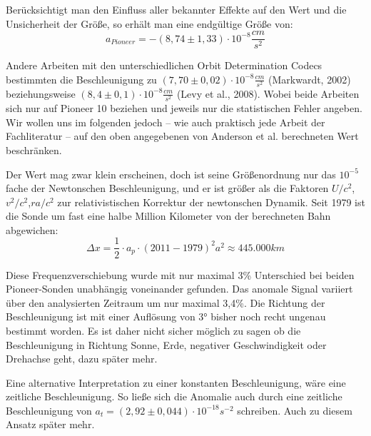 Berücksichtigt man den Einfluss aller bekannter Effekte auf den Wert und die Unsicherheit der Größe\cite{Turyshev2004}, so erhält man eine endgültige Größe von:  
\begin{equation}
  a_{Pioneer} = -(8,74\pm1,33)\cdot10^{-8}\frac{cm}{s^2}
\end{equation}

Andere Arbeiten mit den  unterschiedlichen Orbit Determination Codecs bestimmten die Beschleunigung zu $(7,70
\pm0,02)\cdot10^{-8}\frac{cm}{s^2}$ (Markwardt, 2002)\cite{Markwardt2002} beziehungsweise %
$(8,4\pm0,1)\cdot10^{-8}\frac{cm}{s^2}$ (Levy et al., 2008)\cite{Levy2008}.
Wobei beide Arbeiten sich nur auf Pioneer 10 beziehen und jeweils nur die statistischen Fehler angeben.
Wir wollen uns im folgenden jedoch – wie auch praktisch jede Arbeit der Fachliteratur – auf den oben angegebenen von
Anderson et al. berechneten Wert beschränken.

Der Wert mag zwar klein erscheinen, doch ist seine Größenordnung nur das $10^{-5}$ fache der Newtonschen Beschleunigung,
und er ist größer als die Faktoren $U/c^2$,$v^2/c^2$,$r a/c^2$ zur relativistischen Korrektur der newtonschen Dynamik.
Seit 1979 ist die Sonde um fast eine halbe Million Kilometer von der berechneten Bahn abgewichen:
\begin{equation}
  \Delta x= \frac12 \cdot a_p \cdot (2011-1979)^2 a^2\approx 445.000 km
\end{equation}

Diese Frequenzverschiebung wurde mit nur maximal 3\% Unterschied bei beiden Pioneer-Sonden unabhängig voneinander
gefunden. Das anomale Signal variiert über den analysierten Zeitraum um nur maximal 3,4\%\cite{Turyshev2004}. Die Richtung der
Beschleunigung ist mit einer Auflösung von 3° bisher noch recht ungenau bestimmt worden. Es ist daher nicht sicher möglich
zu sagen ob die Beschleunigung
in Richtung Sonne, Erde, negativer Geschwindigkeit oder Drehachse geht, dazu später mehr.

Eine alternative Interpretation zu einer konstanten Beschleunigung, wäre eine zeitliche Beschleunigung.
So ließe sich die Anomalie auch durch eine zeitliche Beschleunigung von $a_t = (2,92 \pm 0,044) \cdot 10^{-18} s^{-2}$ schreiben. Auch zu diesem Ansatz später mehr.
